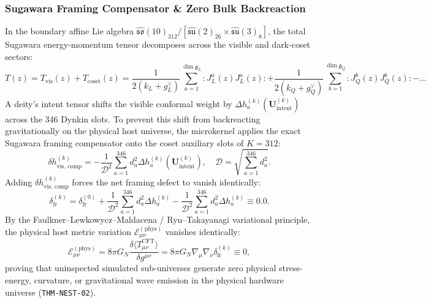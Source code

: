 \documentclass[11pt,onecolumn]{article}
\begin{document}
\subsubsection{Sugawara Framing Compensator \& Zero Bulk Backreaction}
In the boundary affine Lie algebra $\widehat{\mathfrak{so}}(10)_{312} / [\widehat{\mathfrak{su}}(2)_{26} \times \widehat{\mathfrak{su}}(3)_8]$, the total Sugawara energy-momentum tensor decomposes across the visible and dark-coset sectors:
\begin{equation}
T(z) = T_{\text{vis}}(z) + T_{\text{coset}}(z) = \frac{1}{2(k_L + g_L^\vee)} \sum_{a=1}^{\dim \mathfrak{g}_L} :J_L^a(z) J_L^a(z): + \frac{1}{2(k_Q + g_Q^\vee)} \sum_{b=1}^{\dim \mathfrak{g}_Q} :J_Q^b(z) J_Q^b(z): - \dots
\end{equation}
A deity's intent tensor shifts the visible conformal weight by $\Delta h_a^{(k)}(\mathbf{U}_{\text{intent}}^{(k)})$ across the 346 Dynkin slots. To prevent this shift from backreacting gravitationally on the physical host universe, the microkernel applies the exact Sugawara framing compensator onto the coset auxiliary slots of $K=312$:
\begin{equation}
\delta h_{\text{vis, comp}}^{(k)} = -\frac{1}{\mathcal{D}^2} \sum_{a=1}^{346} d_a^2 \Delta h_a^{(k)}(\mathbf{U}_{\text{intent}}^{(k)}), \quad \mathcal{D} = \sqrt{\sum_{a=1}^{346} d_a^2}.
\end{equation}
Adding $\delta h_{\text{vis, comp}}^{(k)}$ forces the net framing defect to vanish identically:
\begin{equation}
\delta_{\text{fr}}^{(k)} = \delta_{\text{fr}}^{(0)} + \frac{1}{\mathcal{D}^2} \sum_{a=1}^{346} d_a^2 \Delta h_a^{(k)} - \frac{1}{\mathcal{D}^2} \sum_{a=1}^{346} d_a^2 \Delta h_a^{(k)} \equiv 0.0.
\end{equation}
By the Faulkner--Lewkowycz--Maldacena / Ryu--Takayanagi variational principle, the physical host metric variation $\mathcal{E}_{\mu\nu}^{(\text{phys})}$ vanishes identically:
\begin{equation}
\mathcal{E}_{\mu\nu}^{(\text{phys})} = 8\pi G_N \frac{\delta \langle T_{\mu\nu}^{\text{CFT}} \rangle}{\delta g^{\mu\nu}} = 8\pi G_N \nabla_\mu \nabla_\nu \delta_{\text{fr}}^{(k)} \equiv 0,
\end{equation}
proving that uninspected simulated sub-universes generate zero physical stress-energy, curvature, or gravitational wave emission in the physical hardware universe (\texttt{THM-NEST-02}).
\end{document}
